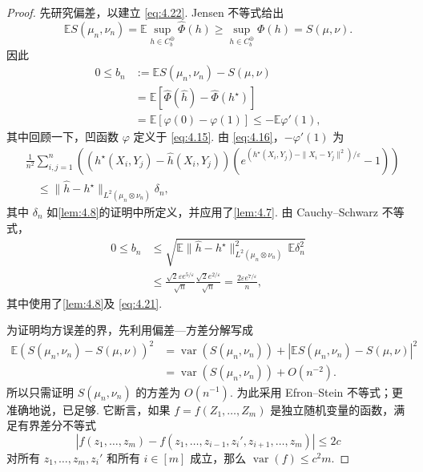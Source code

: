 \begin{proof}
先研究偏差，以建立 \eqref{eq:4.22}. Jensen 不等式给出
$$\mathbb ES(\mu_n,\nu_n)=\mathbb E\sup_{h\in C_b^\oplus}\widehat\Phi(h)
\ge\sup_{h\in C_b^\oplus}\Phi(h)=S(\mu,\nu).$$
因此
$$\begin{aligned}
0\le b_n&:=\mathbb ES(\mu_n,\nu_n)-S(\mu,\nu)\\
&=\mathbb E[\widehat\Phi(\widehat h)-\widehat\Phi(h^\star)]\\
&=\mathbb E[\varphi(0)-\varphi(1)]\le-\mathbb E\varphi'(1),
\end{aligned}$$
其中回顾一下，凹函数 $\varphi$ 定义于 \eqref{eq:4.15}. 由 \eqref{eq:4.16}，$-\varphi'(1)$ 为
$$\begin{aligned}
&\frac1{n^2}\sum_{i,j=1}^n
\left((h^\star(X_i,Y_j)-\widehat h(X_i,Y_j))
\left(e^{(h^\star(X_i,Y_j)-\|X_i-Y_j\|^2)/\varepsilon}-1\right)\right)\\
&\quad\le\|\widehat h-h^\star\|_{L^2(\mu_n\otimes\nu_n)}\delta_n,
\end{aligned}$$
其中 $\delta_n$ 如\autoref{lem:4.8}的证明中所定义，并应用了\autoref{lem:4.7}. 由 Cauchy--Schwarz 不等式，
$$\begin{aligned}
0\le b_n&\le\sqrt{\mathbb E\|\widehat h-h^\star\|_{L^2(\mu_n\otimes\nu_n)}^2\,\mathbb E\delta_n^2}\\
&\le\frac{\sqrt2\varepsilon e^{5/\varepsilon}}{\sqrt n}
\frac{\sqrt2e^{2/\varepsilon}}{\sqrt n}=\frac{2\varepsilon e^{7/\varepsilon}}n,
\end{aligned}$$
其中使用了\autoref{lem:4.8}及 \eqref{eq:4.21}.

为证明均方误差的界，先利用偏差—方差分解写成
$$\begin{aligned}
\mathbb E(S(\mu_n,\nu_n)-S(\mu,\nu))^2
&=\operatorname{var}(S(\mu_n,\nu_n))
+|\mathbb ES(\mu_n,\nu_n)-S(\mu,\nu)|^2\\
&=\operatorname{var}(S(\mu_n,\nu_n))+O(n^{-2}).
\end{aligned}$$
所以只需证明 $S(\mu_n,\nu_n)$ 的方差为 $O(n^{-1})$. 为此采用 Efron--Stein 不等式；更准确地说，\cite[推论3.2]{ref51}已足够. 它断言，如果 $f=f(Z_1,\ldots,Z_m)$ 是独立随机变量的函数，满足有界差分不等式
\begin{equation}\label{eq:4.23}
|f(z_1,\ldots,z_m)-f(z_1,\ldots,z_{i-1},z_i',z_{i+1},\ldots,z_m)|\le2c
\end{equation}
对所有 $z_1,\ldots,z_m,z_i'$ 和所有 $i\in[m]$ 成立，那么 $\operatorname{var}(f)\le c^2m$.


\end{proof}
